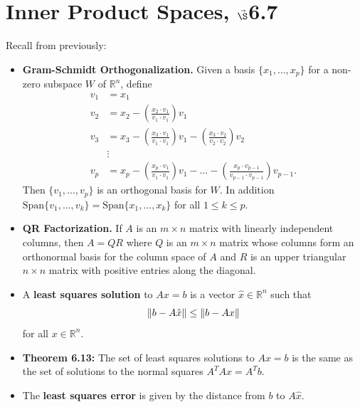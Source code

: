 


%

%
%


\section{{Inner Product Spaces, $\vec\S$6.7}}%
% 


\thispagestyle{fancy}

Recall from previously:

\begin{itemize}
\item {\bf Gram-Schmidt Orthogonalization.} Given a basis $\{x_1, \dots, x_p\}$ for a non-zero subspace $W$ of $\mathbb{R}^n$, define 
\begin{align*}
v_1 & = x_1\\
v_2 & = x_2 - \left( \frac{x_2 \cdot v_1}{v_1 \cdot v_1} \right) v_1\\
v_3 & = x_3 -\left( \frac{x_3 \cdot v_1}{v_1 \cdot v_1} \right) v_1-\left( \frac{x_3 \cdot v_2}{v_2 \cdot v_2} \right) v_2\\
&\vdots\\
v_p & = x_p -\left( \frac{x_p \cdot v_1}{v_1 \cdot v_1} \right) v_1-\dots -\left( \frac{x_p \cdot v_{p-1}}{v_{p-1} \cdot v_{p-1}} \right) v_{p-1}.
\end{align*}
Then $\{v_1, \dots, v_p\}$ is an orthogonal basis for $W$. In addition $\text{Span}\{v_1,\dots, v_k\}=\text{Span}\{ x_1, \dots, x_k\}$ for all $1 \leq k \leq p$.
\item {\bf QR Factorization.} If $A$ is an $m\times n$ matrix with linearly independent columns, then $A=QR$ where $Q$ is an $m\times n$ matrix whose columns form an orthonormal basis for the column space of $A$ and $R$ is an upper triangular $n \times n$ matrix with positive entries along the diagonal. 
\item A {\bf least squares solution} to $Ax=b$ is a vector $\hat{x} \in \mathbb{R}^n$ such that $$\left\lVert b-A\hat{x}\right\rVert \leq \left\lVert b-Ax\right\rVert$$ for all $x \in \mathbb{R}^n$.
\item {\bf Theorem 6.13:} The set of least squares solutions to $Ax=b$ is the same as the set of solutions to the normal squares $A^{T}Ax=A^{T}b$.
\item The {\bf least squares error} is given by the distance from $b$ to $A\hat{x}$.
\end{itemize}

